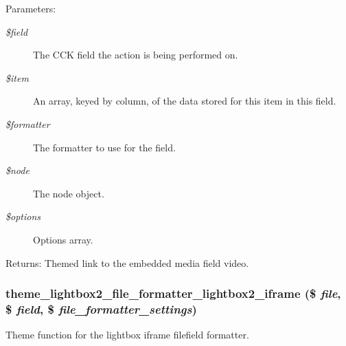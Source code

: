 \begin{Desc}
\item[Parameters:]
\begin{description}
\item[{\em \$field}]The CCK field the action is being performed on. \item[{\em \$item}]An array, keyed by column, of the data stored for this item in this field. \item[{\em \$formatter}]The formatter to use for the field. \item[{\em \$node}]The node object. \item[{\em \$options}]Options array. \end{description}
\end{Desc}
\begin{Desc}
\item[Returns:]Themed link to the embedded media field video. \end{Desc}
\hypertarget{lightbox2_8formatter_8inc_502d02040486a0550fdd60f42880c90b}{
\subsubsection[{theme\_\-lightbox2\_\-file\_\-formatter\_\-lightbox2\_\-iframe}]{\setlength{\rightskip}{0pt plus 5cm}theme\_\-lightbox2\_\-file\_\-formatter\_\-lightbox2\_\-iframe (\$ {\em file}, \/  \$ {\em field}, \/  \$ {\em file\_\-formatter\_\-settings})}}
\label{lightbox2_8formatter_8inc_502d02040486a0550fdd60f42880c90b}


Theme function for the lightbox iframe filefield formatter.

